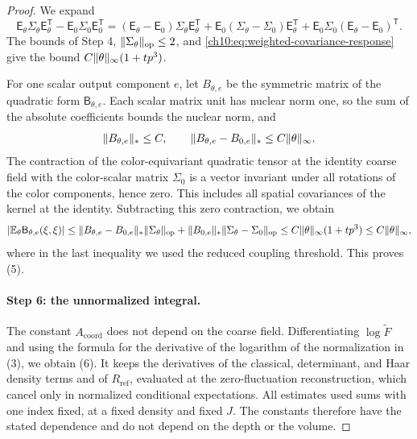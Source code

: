 \begin{proof}
We expand
\[
 \mathsf E_\theta\Sigma_\theta\mathsf E_\theta^{\mathsf T}-\mathsf E_0\Sigma_0\mathsf E_0^{\mathsf T}
 =(\mathsf E_\theta-\mathsf E_0)\Sigma_\theta\mathsf E_\theta^{\mathsf T}+\mathsf E_0(\Sigma_\theta-\Sigma_0)\mathsf E_\theta^{\mathsf T}+\mathsf E_0\Sigma_0(\mathsf E_\theta-\mathsf E_0)^{\mathsf T}.
\]
The bounds of Step 4, $\lVert \Sigma_\theta\rVert_{\mathrm{op}}\le2$, and \eqref{ch10:eq:weighted-covariance-response} give the bound $C\lVert \theta\rVert_\infty(1+tp^3)$.

For one scalar output component $e$, let $B_{\theta,e}$ be the symmetric matrix of the quadratic form $\mathsf B_{\theta,e}$. Each scalar matrix unit has nuclear norm one, so the sum of the absolute coefficients bounds the nuclear norm, and
\[
 \lVert B_{\theta,e}\rVert_*\le C,\qquad \lVert B_{\theta,e}-B_{0,e}\rVert_*\le C\lVert \theta\rVert_\infty.
\]
The contraction of the color-equivariant quadratic tensor at the identity coarse field with the color-scalar matrix $\Sigma_0$ is a vector invariant under all rotations of the color components, hence zero. This includes all spatial covariances of the kernel at the identity. Subtracting this zero contraction, we obtain
\[
 \lvert \mathbb E_\theta\mathsf B_{\theta,e}(\xi,\xi)\rvert\le\lVert B_{\theta,e}-B_{0,e}\rVert_*\lVert \Sigma_\theta\rVert_{\mathrm{op}}+\lVert B_{0,e}\rVert_*\lVert \Sigma_\theta-\Sigma_0\rVert_{\mathrm{op}}\le C\lVert \theta\rVert_\infty(1+tp^3)\le C\lVert \theta\rVert_\infty,
\]
where in the last inequality we used the reduced coupling threshold. This proves (5).

\paragraph{Step 6: the unnormalized integral.}
The constant $A_{\mathrm{coord}}$ does not depend on the coarse field. Differentiating $\log\widetilde F$ and using the formula for the derivative of the logarithm of the normalization in (3), we obtain (6). It keeps the derivatives of the classical, determinant, and Haar density terms and of $R_{\mathrm{ref}}$, evaluated at the zero-fluctuation reconstruction, which cancel only in normalized conditional expectations. All estimates used sums with one index fixed, at a fixed density and fixed $J$. The constants therefore have the stated dependence and do not depend on the depth or the volume.
\end{proof}
